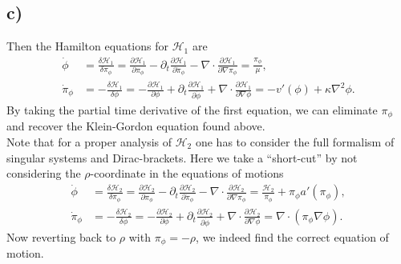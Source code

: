 \documentclass[english, parskip=full]{scrartcl}
\newcommand{\kla}{}
\begin{document}
\subsection*{c)}
Then the Hamilton equations for $\mathcal{H}_1$ are
\begin{align}
\dot{\phi} &= \frac{\delta\mathcal{H}_1}{\delta \pi_\phi } = \frac{\partial\mathcal{H}_1}{\partial \pi_\phi} - \partial_t \frac{\partial\mathcal{H}_1}{\partial \dot{\pi}_\phi} - \nabla \cdot  \frac{\partial\mathcal{H}_1}{\partial \nabla\pi_\phi} = \frac{\pi_\phi}{\mu},\\
\dot{\pi}_\phi &= -\frac{\delta\mathcal{H}_1}{\delta \phi } = -\frac{\partial\mathcal{H}_1}{\partial \phi} + \partial_t \frac{\partial\mathcal{H}_1}{\partial \dot{\phi}} + \nabla \cdot  \frac{\partial\mathcal{H}_1}{\partial \nabla\phi} = -v'(\phi) + \kappa\nabla^2\phi.
\end{align}
By taking the partial time derivative of the first equation, we can eliminate $\pi_\phi$ and recover the Klein-Gordon equation found above.
\\
Note that for a proper analysis of $\mathcal{H}_2$ one has to consider the full formalism of singular systems and Dirac-brackets.
Here we take a ``short-cut'' by not considering the $\rho$-coordinate in the equations of motions
\begin{align}
\dot{\phi} &= \frac{\delta\mathcal{H}_2}{\delta \pi_\phi } = \frac{\partial\mathcal{H}_2}{\partial \pi_\phi} - \partial_t \frac{\partial\mathcal{H}_2}{\partial \dot{\pi}_\phi} - \nabla  \cdot \frac{\partial\mathcal{H}_2}{\partial \nabla\pi_\phi} = \frac{\mathcal{H}_2}{\pi_\phi} + \pi_\phi a'(\pi_\phi),\\
\dot{\pi}_\phi &= -\frac{\delta\mathcal{H}_2}{\delta \phi } = -\frac{\partial\mathcal{H}_2}{\partial \phi} + \partial_t \frac{\partial\mathcal{H}_2}{\partial \dot{\phi}} + \nabla \cdot  \frac{\partial\mathcal{H}_2}{\partial \nabla\phi} = \nabla \cdot \kla\left( {\pi_\phi\nabla\phi } \right) .%
\end{align}
Now reverting back to $\rho$ with $\pi_\phi = -\rho$, we indeed find the correct equation of motion. 
\end{document}
